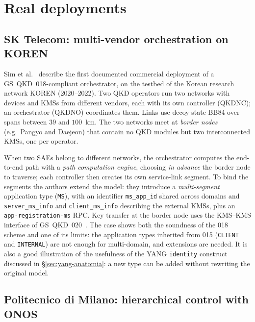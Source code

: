 \section{Real deployments}
\label{sec:casi}

\subsection{SK Telecom: multi-vendor orchestration on KOREN}
\label{sec:sim}

Sim et al.~\cite{sim2023} describe the first documented commercial
deployment of a GS~QKD~018-compliant orchestrator, on the testbed of the
Korean research network KOREN (2020–2022). Two QKD operators run two
networks with devices and KMSs from different vendors, each with its own
controller (QKDNC); an orchestrator (QKDNO) coordinates them. Links use
decoy-state BB84 over spans between $39$ and $100$~km. The two networks meet
at \emph{border nodes} (e.g.\ Pangyo and Daejeon) that contain no QKD
modules but two interconnected KMSs, one per operator.

When two SAEs belong to different networks, the orchestrator computes the
end-to-end path with a \emph{path computation engine}, choosing \emph{in
advance} the border node to traverse; each controller then creates its own
service-link segment. To bind the segments the authors extend the model:
they introduce a \emph{multi-segment} application type (\texttt{MS}), with
an identifier \texttt{ms\_app\_id} shared across domains and
\texttt{server\_ms\_info} and \texttt{client\_ms\_info} describing the
external KMSs, plus an \texttt{app-registration-ms} RPC. Key transfer at
the border node uses the KMS–KMS interface of GS~QKD~020~\cite{qkd020}.
The case shows both the soundness of the 018 scheme and one of its limits:
the application types inherited from 015 (\texttt{CLIENT} and
\texttt{INTERNAL}) are not enough for multi-domain, and extensions are
needed. It is also a good illustration of the usefulness of the YANG
\texttt{identity} construct discussed in §\ref{sec:yang-anatomia}: a new
type can be added without rewriting the original model.

\subsection{Politecnico di Milano: hierarchical control with ONOS}

